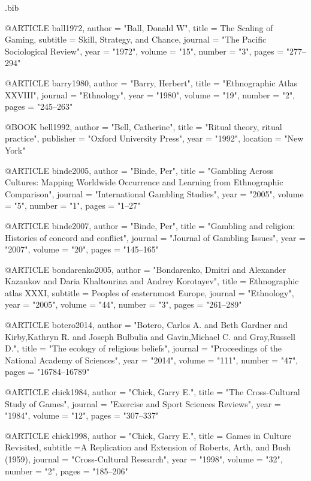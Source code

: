 \begin{filecontents}{\IJSRAidentifier.bib}

@ARTICLE {ball1972,
	author  = "Ball, Donald W",
	title   = {The Scaling of Gaming},
	subtitle = {Skill, Strategy, and Chance},
	journal = "The Pacific Sociological Review",
	year    = "1972",
	volume  = "15",
	number  = "3",
	pages   = "277--294"
}

@ARTICLE {barry1980,
	author  = "Barry, Herbert",
	title   = "Ethnographic Atlas XXVIII",
	journal = "Ethnology",
	year    = "1980",
	volume  = "19",
	number  = "2",
	pages   = "245--263"
}

@BOOK {bell1992,
	author    = "Bell, Catherine",
	title     = "Ritual theory, ritual practice",
	publisher = "Oxford University Press",
	year      = "1992",
	location   = "New York"
}

@ARTICLE {binde2005,
	author  = "Binde, Per",
	title   = "Gambling Across Cultures: Mapping Worldwide Occurrence and Learning from Ethnographic Comparison",
	journal = "International Gambling Studies",
	year    = "2005",
	volume  = "5",
	number  = "1",
	pages   = "1--27"
}

@ARTICLE {binde2007,
	author  = "Binde, Per",
	title   = "Gambling and religion: Histories of concord and conflict",
	journal = "Journal of Gambling Issues",
	year    = "2007",
	volume  = "20",
	pages   = "145--165"
}

@ARTICLE {bondarenko2005,
	author  = "Bondarenko, Dmitri and Alexander Kazankov and Daria Khaltourina and Andrey Korotayev",
	title   = {Ethnographic atlas XXXI},
	subtitle = {Peoples of easternmost Europe},
	journal = "Ethnology",
	year    = "2005",
	volume  = "44",
	number  = "3",
	pages   = "261--289"
}

@ARTICLE {botero2014,
	author  = "Botero, Carlos A. and  Beth Gardner and Kirby,Kathryn R.  and Joseph Bulbulia and Gavin,Michael C.  and Gray,Russell D.",
	title   = "The ecology of religious beliefs",
	journal = "Proceedings of the National Academy of Sciences",
	year    = "2014",
	volume  = "111",
	number  = "47",
	pages   = "16784--16789"
}

@ARTICLE {chick1984,
	author  = "Chick, Garry E.",
	title   = "The Cross-Cultural Study of Games",
	journal = "Exercise and Sport Sciences Reviews",
	year    = "1984",
	volume  = "12",
	pages   = "307--337"
}

@ARTICLE {chick1998,
	author  = "Chick, Garry E.",
	title   = {Games in Culture Revisited},
	subtitle ={A Replication and Extension of Roberts, Arth, and Bush (1959)},
	journal = "Cross-Cultural Research",
	year    = "1998",
	volume  = "32",
	number  = "2",
	pages   = "185--206"
}


\end{filecontents}
